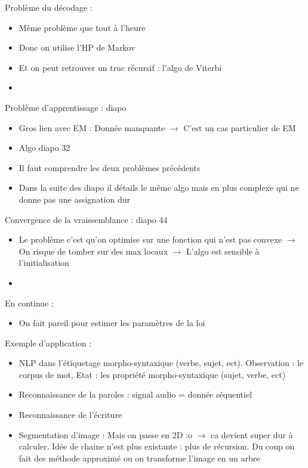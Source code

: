 \documentclass{article}
\theoremstyle{plain}%
\theoremstyle{definition}
\theoremstyle{remark}
\begin{document}
Problème du décodage : 
\begin{itemize}
    \item Même problème que tout à l'heure
    \item Donc on utilise l'HP de Markov
    \item Et on peut retrouver un truc récursif : l'algo de Viterbi
    \item 
\end{itemize}

Problème d'apprentissage : diapo
\begin{itemize}
    \item Gros lien avec EM : Donnée manquante $\rightarrow$ C'est un cas particulier de EM
    \item Algo diapo 32 
    \item Il faut comprendre les deux problèmes précédents
    \item Dans la suite des diapo il détails le même algo mais en plus complexe qui ne donne pas une assignation dur
\end{itemize}

Convergence de la vraissemblance : diapo 44
\begin{itemize}
    \item Le problème c'est qu'on optimise sur une fonction qui n'est pas convexe $\rightarrow$ On risque de tomber sur des max locaux $\rightarrow$ L'algo est sensible à l'initialisation
    \item 
\end{itemize}

En continue : 
\begin{itemize}
    \item On fait pareil pour estimer les paramètres de la loi
\end{itemize}

Exemple d'application : 
\begin{itemize}
    \item NLP dans l'étiquetage morpho-syntaxique (verbe, sujet, ect). Observation : le corpus de mot, Etat : les propriété morpho-syntaxique (sujet, verbe, ect)
    \item Reconnaissance de la paroles : signal audio = donnée séquentiel
    \item Reconnaissance de l'écriture
    \item Segmentation d'image : Mais on passe en 2D :o $\rightarrow$ ca devient super dur à calculer. Idée de chaine n'est plus existante : plus de récursion. Du coup on fait des méthode approximé ou on transforme l'image en un arbre
\end{itemize}
\end{document}
